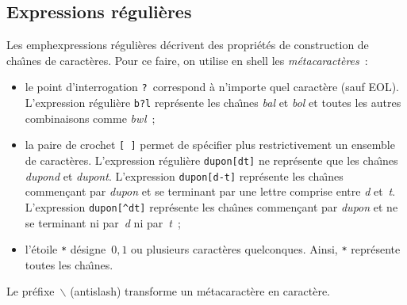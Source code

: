 \subsection{Expressions r\'eguli\`eres}
\begin{frame}
  Les emph{expressions r\'eguli\`eres} d\'ecrivent des propri\'et\'es de
  construction de cha\^\i{}nes de caract\`eres. Pour ce faire, on
  utilise en shell les \emph{m\'etacaract\`eres}~:
  \begin{itemize}
  \item le point d'interrogation \texttt{?}\ correspond \`a n'importe
    quel caract\`ere (sauf EOL).  L'expression r\'eguli\`ere
    \texttt{b?l} repr\'esente les cha\^\i{}nes \textit{bal} et
    \textit{bol} et toutes les autres combinaisons comme
    \textit{bwl}~;
  \item la paire de crochet \texttt{[ ]} permet de sp\'ecifier plus
    restrictivement un ensemble de caract\`eres. L'expression
    r\'eguli\`ere \texttt{dupon[dt]} ne repr\'esente que les
    cha\^\i{}nes \textit{dupond} et \textit{dupont}. L'expression
    \texttt{dupon[d-t]} repr\'esente les cha\^\i{}nes commen\c{c}ant
    par \textit{dupon} et se terminant par une lettre comprise entre
    \textit{d} et~\textit{t}. L'expression \texttt{dupon[\^{}dt]}
    repr\'esente les cha\^\i{}nes commen\c{c}ant par \textit{dupon} et
    ne se terminant ni par~\textit{d} ni par~\textit{t}~;
  \item l'\'etoile \texttt{*} d\'esigne~$0,1$ ou plusieurs
    caract\`eres quelconques.  Ainsi, \texttt{*} repr\'esente toutes
    les cha\^\i{}nes.
  \end{itemize}
  Le pr\'efixe~$\backslash$ (antislash) transforme un
  m\'etacaract\`ere en caract\`ere.  
\end{frame}
